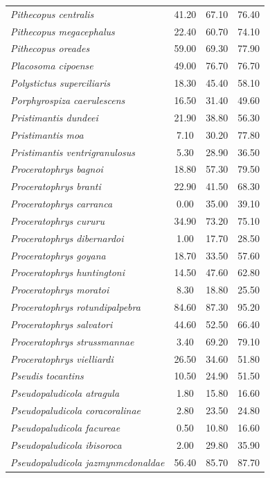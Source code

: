 \documentclass[12pt,openright,oneside,a4paper,english]{abntex2}
\begin{document}
\begin{longtable}{lccc}
	\textit{Pithecopus centralis}&41.20 &67.10 &76.40 \\
	\textit{Pithecopus megacephalus}&22.40 &60.70 &74.10 \\
	\textit{Pithecopus oreades}&59.00 &69.30 &77.90 \\
	\textit{Placosoma cipoense}&49.00 &76.70 &76.70 \\
	\textit{Polystictus superciliaris}&18.30 &45.40 &58.10 \\
	\textit{Porphyrospiza caerulescens}&16.50 &31.40 &49.60 \\
	\textit{Pristimantis dundeei}&21.90 &38.80 &56.30 \\
	\textit{Pristimantis moa}&7.10 &30.20 &77.80 \\
	\textit{Pristimantis ventrigranulosus}&5.30 &28.90 &36.50 \\
	\textit{Proceratophrys bagnoi}&18.80 &57.30 &79.50 \\
	\textit{Proceratophrys branti}&22.90 &41.50 &68.30 \\
	\textit{Proceratophrys carranca}&0.00 &35.00 &39.10 \\
	\textit{Proceratophrys cururu}&34.90 &73.20 &75.10 \\
	\textit{Proceratophrys dibernardoi}&1.00 &17.70 &28.50 \\
	\textit{Proceratophrys goyana}&18.70 &33.50 &57.60 \\
	\textit{Proceratophrys huntingtoni}&14.50 &47.60 &62.80 \\
	\textit{Proceratophrys moratoi}&8.30 &18.80 &25.50 \\
	\textit{Proceratophrys rotundipalpebra}&84.60 &87.30 &95.20 \\
	\textit{Proceratophrys salvatori}&44.60 &52.50 &66.40 \\
	\textit{Proceratophrys strussmannae}&3.40 &69.20 &79.10 \\
	\textit{Proceratophrys vielliardi}&26.50 &34.60 &51.80 \\
	\textit{Pseudis tocantins}&10.50 &24.90 &51.50 \\
	\textit{Pseudopaludicola atragula}&1.80 &15.80 &16.60 \\
	\textit{Pseudopaludicola coracoralinae}&2.80 &23.50 &24.80 \\
	\textit{Pseudopaludicola facureae}&0.50 &10.80 &16.60 \\
	\textit{Pseudopaludicola ibisoroca}&2.00 &29.80 &35.90 \\
	\textit{Pseudopaludicola jazmynmcdonaldae}&56.40 &85.70 &87.70 \\

\end{longtable}
\end{document}
